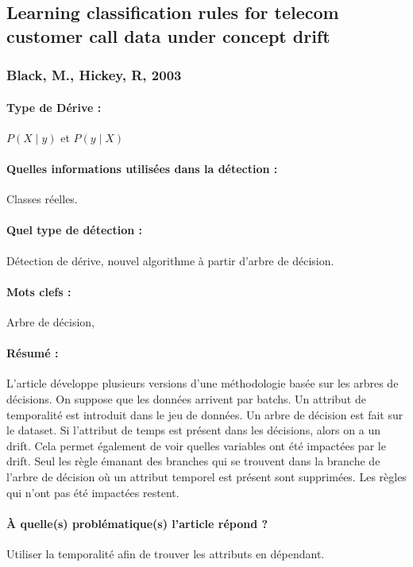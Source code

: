 \documentclass[11pt,a4paper]{report}
\begin{document}
\subsection{Learning classification rules for telecom  customer call data under concept drift}
\subsubsection{Black, M., Hickey, R, 2003}

\paragraph{Type de Dérive :} $P(X\mid y)$ et $P(y \mid X)$
\paragraph{Quelles informations utilisées dans la détection :} Classes réelles.
\paragraph{Quel type de détection :} Détection de dérive, nouvel algorithme à partir d'arbre de décision.

\paragraph{Mots clefs :} Arbre de décision, 

\paragraph{Résumé :} L'article développe plusieurs versions d'une méthodologie basée sur les arbres de décisions.  On suppose que les données arrivent par batchs. Un attribut de temporalité est introduit dans le jeu de données. Un arbre de décision est fait sur le dataset. Si l’attribut de temps est présent dans les décisions, alors on a un drift. Cela permet également de voir quelles variables ont été impactées par le drift. Seul les règle émanant des branches qui se trouvent dans la branche de l’arbre de décision où un attribut temporel est présent sont supprimées. Les règles qui n’ont pas été impactées restent.

\paragraph{À quelle(s) problématique(s) l'article répond ?} Utiliser la temporalité afin de trouver les attributs en dépendant.
\end{document}
